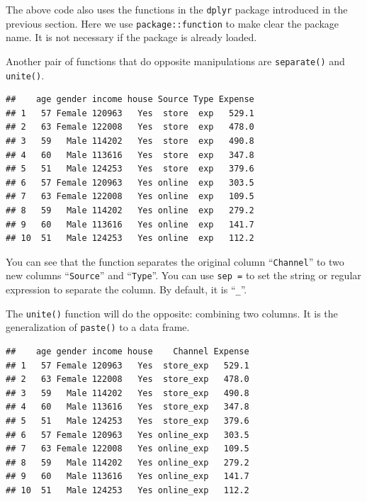 \documentclass[12pt,]{krantz}
\makeatletter
\newenvironment{Shaded}{\begin{snugshade}}{\end{snugshade}}
\newcommand{\DataTypeTok}[1]{\textcolor[rgb]{0.27,0.27,0.27}{#1}}
\newcommand{\KeywordTok}[1]{\textcolor[rgb]{0.27,0.27,0.27}{\textbf{#1}}}
\newcommand{\NormalTok}[1]{#1}
\newcommand{\OperatorTok}[1]{\textcolor[rgb]{0.43,0.43,0.43}{\textbf{#1}}}
\newcommand{\StringTok}[1]{\textcolor[rgb]{0.5,0.5,0.5}{#1}}
\newenvironment{kframe}{%
\medskip{}
\setlength{\fboxsep}{.8em}
 \def\at@end@of@kframe{}%
 \ifinner\ifhmode%
  \def\at@end@of@kframe{\end{minipage}}%
  \begin{minipage}{\columnwidth}%
 \fi\fi%
 \def\FrameCommand##1{\hskip\@totalleftmargin \hskip-\fboxsep
 \colorbox{shadecolor}{##1}\hskip-\fboxsep
     \hskip-\linewidth \hskip-\@totalleftmargin \hskip\columnwidth}%
 \MakeFramed {\advance\hsize-\width
   \@totalleftmargin\z@ \linewidth\hsize
   \@setminipage}}%
 {\par\unskip\endMakeFramed%
 \at@end@of@kframe}
\renewenvironment{Shaded}{\begin{kframe}}{\end{kframe}}
\makeatother
\begin{document}
The above code also uses the functions in the \texttt{dplyr} package introduced in the previous section. Here we use \texttt{package::function} to make clear the package name. It is not necessary if the package is already loaded.

Another pair of functions that do opposite manipulations are \texttt{separate()} and \texttt{unite()}.

\begin{Shaded}
\end{Shaded}

\begin{verbatim}
##    age gender income house Source Type Expense
## 1   57 Female 120963   Yes  store  exp   529.1
## 2   63 Female 122008   Yes  store  exp   478.0
## 3   59   Male 114202   Yes  store  exp   490.8
## 4   60   Male 113616   Yes  store  exp   347.8
## 5   51   Male 124253   Yes  store  exp   379.6
## 6   57 Female 120963   Yes online  exp   303.5
## 7   63 Female 122008   Yes online  exp   109.5
## 8   59   Male 114202   Yes online  exp   279.2
## 9   60   Male 113616   Yes online  exp   141.7
## 10  51   Male 124253   Yes online  exp   112.2
\end{verbatim}

You can see that the function separates the original column ``\texttt{Channel}'' to two new columns ``\texttt{Source}'' and ``\texttt{Type}''. You can use \texttt{sep\ =} to set the string or regular expression to separate the column. By default, it is ``\texttt{\_}''.

The \texttt{unite()} function will do the opposite: combining two columns. It is the generalization of \texttt{paste()} to a data frame.

\begin{Shaded}
\end{Shaded}

\begin{verbatim}
##    age gender income house    Channel Expense
## 1   57 Female 120963   Yes  store_exp   529.1
## 2   63 Female 122008   Yes  store_exp   478.0
## 3   59   Male 114202   Yes  store_exp   490.8
## 4   60   Male 113616   Yes  store_exp   347.8
## 5   51   Male 124253   Yes  store_exp   379.6
## 6   57 Female 120963   Yes online_exp   303.5
## 7   63 Female 122008   Yes online_exp   109.5
## 8   59   Male 114202   Yes online_exp   279.2
## 9   60   Male 113616   Yes online_exp   141.7
## 10  51   Male 124253   Yes online_exp   112.2
\end{verbatim}
\end{document}

